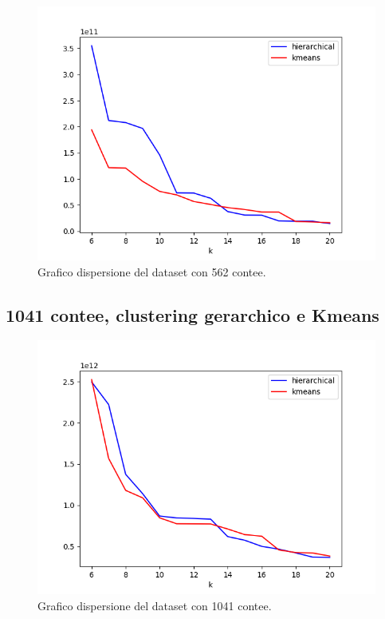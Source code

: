 \documentclass{article}
\begin{document}
\begin{figure}[H]
	\hspace*{-1cm}\begin{minipage}{0.55\linewidth}
	\centering
	 
	\end{minipage}
	\begin{minipage}{0.7\linewidth}
		\includegraphics[width=1.0\linewidth, valign=t]{figures/output212}
		\caption*{Grafico dispersione del dataset con 562 contee.}
	\end{minipage}
\end{figure}
\subsection*{1041 contee, clustering gerarchico e Kmeans }
\begin{figure}[H]
	\hspace*{-1cm}\begin{minipage}{0.55\linewidth}
	\centering
	
	\end{minipage}
	\begin{minipage}{0.7\linewidth}
		\includegraphics[width=1.0\linewidth, valign=t]{figures/output1041}
		\caption*{Grafico dispersione del dataset con 1041 contee.}
				
	\end{minipage}
\end{figure}
\end{document}
